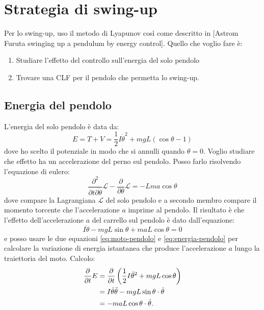 \section{Strategia di swing-up}
Per lo swing-up, uso il metodo di Lyapunov così come descritto in [Astrom Furuta swinging up a pendulum by energy control].
Quello che voglio fare è:

\begin{enumerate}
    \item Studiare l'effetto del controllo sull'energia del solo pendolo
    \item Trovare una CLF per il pendolo che permetta lo swing-up.
\end{enumerate}

\subsection{Energia del pendolo}
\label{subsec:energia-pendolo}
L'energia del solo pendolo è data da:
\begin{equation}
    E = T + V = \frac 1 2 I \dot \theta^2 + mgL(\cos\theta-1)
    \label{eq:energia-pendolo}
\end{equation}
dove ho scelto il potenziale in modo che si annulli quando $\theta=0$. Voglio studiare che effetto ha un accelerazione del perno sul pendolo. Posso farlo risolvendo l'equazione di eulero:
\begin{equation*}
    \frac {\partial^2} {\partial t \partial \dot \theta} \mathcal L - \frac \partial {\partial \theta} \mathcal L = -L ma \cos \theta
\end{equation*}
dove compare la Lagrangiana $\mathcal L$ del solo pendolo e a secondo membro compare il momento torcente che l'accelerazione $a$ imprime al pendolo. Il risultato è che l'effetto dell'accelerazione $a$ del carrello sul pendolo è dato dall'equazione:
\begin{equation}
    I \ddot \theta - mgL\sin \theta + maL \cos \theta = 0
    \label{eq:moto-pendolo}
\end{equation}
e posso usare le due equazioni \eqref{eq:moto-pendolo} e \eqref{eq:energia-pendolo} per calcolare la variazione di energia istantanea che produce l'accelerazione $a$ lungo la traiettoria del moto. Calcolo:
\begin{equation}
    \begin{aligned}
        \frac \partial {\partial t} E
        &= \frac \partial {\partial t} \left(\frac 1 2 I \dot \theta ^2 + mgL \cos \theta  \right) \\
        &= I \dot \theta \ddot \theta - mgL \sin \theta \cdot \dot \theta \\
        &= -maL \cos \theta \cdot \dot \theta
        .
        \label{eq:effetto-energia}
    \end{aligned}
\end{equation}
